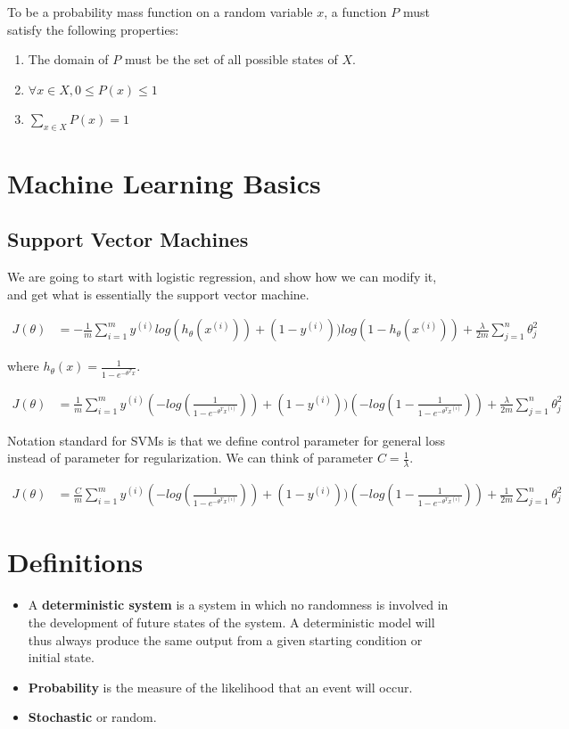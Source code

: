 \documentclass{article}
\begin{document}
To be a probability mass function on a random variable $x$, a function $P$ must
satisfy the following properties:
\begin{enumerate}
\item The domain of $P$ must be the set of all possible states of $X$.
\item $\forall x \in X, 0 \le P(x) \le 1$
\item $\sum_{x \in X} P(x) = 1$	
\end{enumerate}
\section{Machine Learning Basics}
\subsection{Support Vector Machines}

We are going to start with logistic regression, and show how we can modify it, and get what is essentially the support vector machine.

\begin{align*}
J(\theta) &= -\frac{1}{m} \sum_{i = 1}^{m} {y^{(i)}log(h_{\theta}(x^{(i)})) + (1 - y^{(i)}))log(1 - h_{\theta}(x^{(i)}))} + \frac{\lambda}{2m}\sum_{j = 1}^{n}\theta_j^2
\end{align*}

\noindent
where $h_{\theta}(x) = \frac{1}{1 - e^{-\theta^{T}x}}$.

\begin{align*}
J(\theta) &= \frac{1}{m} \sum_{i = 1}^{m} {y^{(i)}(-log(\frac{1}{1 - e^{-\theta^{T}x^{(i)}}})) + (1 - y^{(i)}))(-log(1 - \frac{1}{1 - e^{-\theta^{T}x^{(i)}}}))} + \frac{\lambda}{2m}\sum_{j = 1}^{n}\theta_j^2
\end{align*}

\noindent
Notation standard for SVMs is that we define control parameter for general loss instead of parameter for regularization. We can think of parameter $C = \frac{1}{\lambda}$. 

\begin{align*}
J(\theta) &= \frac{C}{m} \sum_{i = 1}^{m} {y^{(i)}(-log(\frac{1}{1 - e^{-\theta^{T}x^{(i)}}})) + (1 - y^{(i)}))(-log(1 - \frac{1}{1 - e^{-\theta^{T}x^{(i)}}}))} + \frac{1}{2m}\sum_{j = 1}^{n}\theta_j^2
\end{align*}

\section{Definitions}
\begin{itemize}
\item A \textbf{deterministic system} is a system in which no randomness is involved in the development of future states of the system. A deterministic model will thus always produce the same output from a given starting condition or initial state.

\item \textbf{Probability} is the measure of the likelihood that an event will occur.

\item \textbf{Stochastic} or random.  
\end{itemize}
\end{document}
